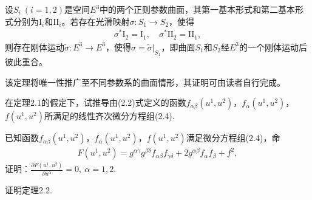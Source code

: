 \documentclass[../../main.tex]{subfiles}%
\begin{document}
\begin{theorem}
设$S_i\ (i=1,2)$是空间$E^3$中的两个正则参数曲面，其第一基本形式和第二基本形式分别为$\mathrm{I}_i$和$\mathrm{II}_i$。若存在光滑映射$\sigma: S_1 \to S_2$，使得
\begin{align}
\sigma^*\mathrm{I}_2 = \mathrm{I}_1,\quad \sigma^*\mathrm{II}_2 = \mathrm{II}_1,
\label{eq:::IOJIOWAIJ2.8}
\end{align}
则存在刚体运动$\tilde{\sigma}: E^3 \to E^3$，使得$\sigma = \tilde{\sigma}\big|_{S_1}$，即曲面$S_1$和$S_2$经$E^3$的一个刚体运动后彼此重合。
\end{theorem}
\begin{remark}
该定理将唯一性推广至不同参数系的曲面情形，其证明可由读者自行完成。
\end{remark}

\begin{example}
在定理2.1的假定下，试推导由(2.2)式定义的函数$f_{\alpha\beta}(u^1,u^2)$，$f_\alpha(u^1,u^2)$，$f(u^1,u^2)$所满足的线性齐次微分方程组(2.4).
\end{example}

\begin{example}
已知函数$f_{\alpha\beta}(u^1,u^2)$，$f_\alpha(u^1,u^2)$，$f(u^1,u^2)$满足微分方程组(2.4)，命
\begin{align*}
F(u^1,u^2)=g^{\alpha\gamma}g^{\beta\delta}f_{\alpha\beta}f_{\gamma\delta}+2g^{\alpha\beta}f_\alpha f_\beta+f^2,
\end{align*}
证明：$\displaystyle\frac{\partial F(u^1,u^2)}{\partial u^\alpha}=0,\ \alpha=1,2.$
\end{example}

\begin{example}
证明定理2.2.
\end{example}
\end{document}
